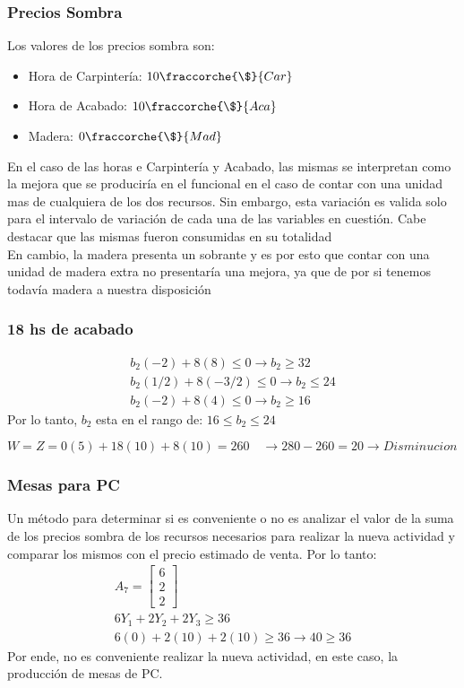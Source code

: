 \begin{homeworkProblem}[1][Dakota]
\subsubsection{Precios Sombra}
Los valores de los precios sombra son:
\begin{itemize}
  \item Hora de Carpintería: $10 \fraccorche{\$}{Car}$
  \item Hora de Acabado: $10 \fraccorche{\$}{Aca}$
  \item Madera: $0 \fraccorche{\$}{Mad}$
\end{itemize}
En el caso de las horas e Carpintería y Acabado, las mismas se interpretan como la mejora que se produciría en el funcional en el caso de contar con una unidad mas de cualquiera de los dos recursos.
Sin embargo, esta variación es valida solo para el intervalo de variación de cada una de las variables en cuestión. Cabe destacar que las mismas fueron consumidas en su totalidad\\

En cambio, la madera presenta un sobrante y es por esto que contar con una unidad de madera extra no presentaría una mejora, ya que de por si tenemos todavía madera a nuestra disposición
\subsubsection{18 hs de acabado}

\begin{align*}
  b_2(-2) + 8(8) \le 0 \rightarrow b_2 \ge 32 \\
  b_2(1/2) + 8(-3/2) \le 0 \rightarrow b_2 \le 24 \\
  b_2(-2) + 8(4) \le 0 \rightarrow b_2 \ge 16
\end{align*}
Por lo tanto, $b_2$ esta en el rango de: $16  \le b_2 \le 24$

$W = Z = 0(5) + 18(10) + 8(10) = 260 \quad \rightarrow 280-260 = 20 \rightarrow Disminucion$

\subsubsection{Mesas para PC}
Un método para determinar si es conveniente o no es analizar el valor de la suma de los precios sombra de los recursos necesarios para realizar la nueva actividad y comparar los mismos con el precio estimado de venta. Por lo tanto:
\begin{align*}
  A_7 =
  \begin{bmatrix}
    6  \\ 2 \\ 2
  \end{bmatrix} \\
  6Y_1+2Y_2+2Y_3 \ge 36 \\
  6(0) + 2(10) + 2(10) \ge 36 \rightarrow 40 \ge 36
\end{align*}
Por ende, no es conveniente realizar la nueva actividad, en este caso, la producción de mesas de PC.



\end{homeworkProblem}
